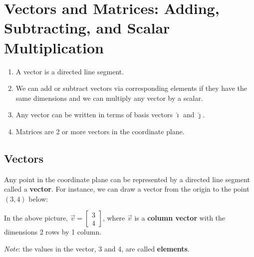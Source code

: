 \documentclass{article}
\begin{document}
\section*{Vectors and Matrices: Adding, Subtracting, and Scalar Multiplication}

\begin{tcolorbox}[colframe=orange!70!white, coltitle=black, title=\textbf{Summary}]
\begin{enumerate}
    \item A vector is a directed line segment.
    \item We can add or subtract vectors via corresponding elements if they have the same dimensions and we can multiply any vector by a scalar.
    \item Any vector can be written in terms of basis vectors $\hat{\imath}$ and $\hat{\jmath}$.
    \item Matrices are 2 or more vectors in the coordinate plane.
\end{enumerate}
\end{tcolorbox}

\subsection*{Vectors}

Any point in the coordinate plane can be represented by a directed line segment called a \textbf{vector}. For instance, we can draw a vector from the origin to the point $(3,4)$ below: \newline\\
\begin{center}
\end{center}
\vspace{1in}

In the above picture, $\vec{v} = \begin{bmatrix}
3 \\ 4
\end{bmatrix}$, where $\vec{v}$ is a \textbf{column vector} with the dimensions 2 rows by 1 column.	\vspace{0.25in}

\emph{Note}: the values in the vector, 3 and 4, are called \textbf{elements}.
\end{document}
